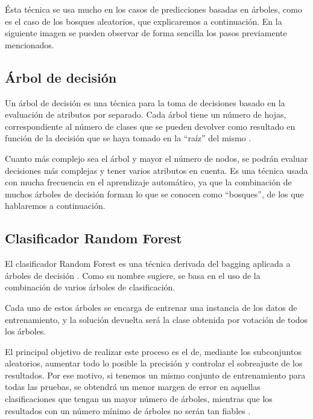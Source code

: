 Ésta técnica se usa mucho en los casos de predicciones basadas en árboles, como es el caso de los bosques aleatorios, que explicaremos a continuación. En la siguiente imagen se pueden observar de forma sencilla los pasos previamente mencionados.


\subsection{Árbol de decisión}

Un árbol de decisión es una técnica para la toma de decisiones basado en la evaluación de atributos por separado. Cada árbol tiene un número de hojas, correspondiente al número de clases que se pueden devolver como resultado en función de la decisión que se haya tomado en la ``raíz'' del mismo \cite{decisiontree}.


Cuanto más complejo sea el árbol y mayor el número de nodos, se podrán evaluar decisiones más complejas y tener varios atributos en cuenta. Es una técnica usada con mucha frecuencia en el aprendizaje automático, ya que la combinación de muchos árboles de decisión forman lo que se conocen como ``bosques'', de los que hablaremos a continuación.


\subsection{Clasificador Random Forest}

El clasificador Random Forest es una técnica derivada del bagging aplicada a árboles de decisión \cite{randomforestclassifier}. Como su nombre sugiere, se basa en el uso de la combinación de varios árboles de clasificación. 

Cada uno de estos árboles se encarga de entrenar una instancia de los datos de entrenamiento, y la solución devuelta será la clase obtenida por votación de todos los árboles. 

El principal objetivo de realizar este proceso es el de, mediante los subconjuntos aleatorios, aumentar todo lo posible la precisión y controlar el sobreajuste de los resultados. Por ese motivo, si tenemos un mismo conjunto de entrenamiento para todas las pruebas, se obtendrá un menor margen de error en aquellas clasificaciones que tengan un mayor número de árboles, mientras que los resultados con un número mínimo de árboles no serán tan fiables \cite{randomforestclassifierberkeley}.

